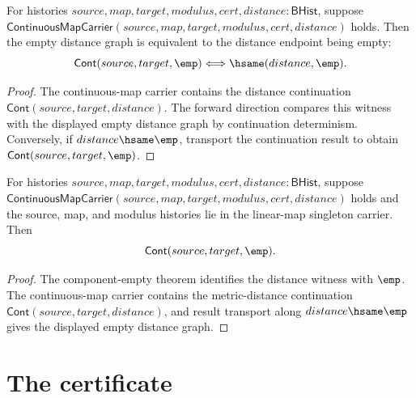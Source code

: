 \begin{theorem}
\label{thm:funcobj-linear-singleton-continuous-map-distance-graph-empty-iff}
For histories $source,map,target,modulus,cert,distance:\mathsf{BHist}$,
suppose
$\mathsf{ContinuousMapCarrier}(source,map,target,modulus,cert,distance)$
holds. Then the empty distance graph is equivalent to the distance endpoint
being empty:
$$
\mathsf{Cont}(source,target,\emp)\Longleftrightarrow\hsame(distance,\emp).
$$
\end{theorem}
\begin{proof}
The continuous-map carrier contains the distance continuation
$\mathsf{Cont}(source,target,distance)$. The forward direction compares this
witness with the displayed empty distance graph by continuation determinism.
Conversely, if $distance\hsame\emp$, transport the continuation result to
obtain $\mathsf{Cont}(source,target,\emp)$.
\end{proof}

\begin{lemma}
\label{lem:funcobj-linear-singleton-continuous-map-distance-graph-empty}
For histories $source,map,target,modulus,cert,distance:\mathsf{BHist}$,
suppose
$\mathsf{ContinuousMapCarrier}(source,map,target,modulus,cert,distance)$ holds
and the source, map, and modulus histories lie in the linear-map singleton
carrier. Then
$$
\mathsf{Cont}(source,target,\emp).
$$
\end{lemma}
\begin{proof}
The component-empty theorem identifies the distance witness with $\emp$. The
continuous-map carrier contains the metric-distance continuation
$\mathsf{Cont}(source,target,distance)$, and result transport along
$distance\hsame\emp$ gives the displayed empty distance graph.
\end{proof}

\section{The certificate}
\label{sec:funcobj-certificate}

